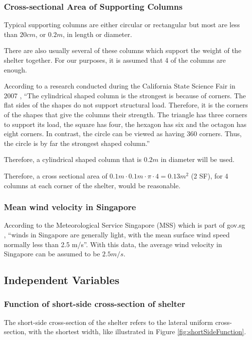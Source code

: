 \documentclass[a4paper,titlepage]{article}
\begin{document}
\subsubsection{Cross-sectional Area of Supporting Columns}
Typical supporting columns are either circular or rectangular but most are less than $20\si{cm}$, or $0.2\si{m}$, in length or diameter.

There are also usually several of these columns which support the weight of the shelter together. For our purposes, it is assumed that 4 of the columns are enough.

According to a research conducted during the California State Science Fair in 2007 \cite{shipp_strengthofshapes}, ``The cylindrical shaped column is the strongest is because of corners. The flat sides of the shapes do not support structural load. Therefore, it is the corners of the shapes that give the columns their strength. The triangle has three corners to support its load, the square has four, the hexagon has six and the octagon has eight corners. In contrast, the circle can be viewed as having 360 corners. Thus, the circle is by far the strongest shaped column.''

Therefore, a cylindrical shaped column that is $0.2\si{m}$ in diameter will be used.

Therefore, a cross sectional area of $0.1\si{m}\cdot0.1\si{m}\cdot\pi\cdot4=0.13\si{m^2}$ (2 SF), for 4 columns at each corner of the shelter, would be reasonable. 

\subsubsection{Mean wind velocity in Singapore}

According to the Meteorological Service Singapore (MSS) which is part of gov.sg \cite{govsg-rainclimate}, ``winds in Singapore are generally light, with the mean surface wind speed normally less than 2.5 m/s''. With this data, the average wind velocity in Singapore can be assumed to be $2.5\si{m/s}$.

\subsection{Independent Variables}\label{sec:Variables:Independent Variables}

\subsubsection{Function of short-side cross-section of shelter}
The short-side cross-section of the shelter refers to the lateral uniform cross-section, with the shortest width, like illustrated in Figure \ref{fig:shortSideFunction}.
\end{document}
